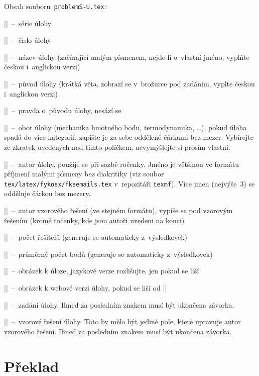 \documentclass[fykos]{fksbase}
\begin{document}
Obsah souboru~\texttt{problemS-U.tex}:
\begin{compactitem}
	\item \texinline|\probbatch|~--~série úlohy
	\item \texinline|\probno|~--~číslo úlohy
	\item \texinline|\probname|~--~název úlohy (začínající malým písmenem, nejde-li
		o~vlastní jméno, vyplňte českou i~anglickou verzi)
	\item \texinline|\proborigin|~--~původ úlohy (krátká věta, zobrazí se v~brožurce pod
		zadáním, vyplte českou i~anglickou verzi)
	\item \texinline|\proborigintruth|~--~pravda o~původu úlohy, nesází se
	\item \texinline|\probtopics|~--~obor úlohy (mechanika hmotného bodu, termodynamika, \dots),
	pokud úloha spadá do více kategorií, zapište je za sebe oddělené čárkami bez mezer.
	Vybírejte ze zkratek uvedených nad tímto políčkem, nevymýšlejte si prosím vlastní.
	\item \texinline|\probauthors|~--~autor úlohy, použije se při sazbě ročenky. Jméno
	je většinou ve formátu příjmení malými písmeny bez diakritiky (viz soubor
	\texttt{tex/latex/fykosx/fksemails.tex} v~repozitáři \texttt{texmf}). Více jmen
	(nejvýše~3) se odděluje čárkou bez mezery.
	\item \texinline|\probsolauthors|~--~autor vzorového řešení (ve stejném formátu),
		vypíše se pod vzorovým řešením (kromě ročenky, kde jsou autoři uvedeni na konci)
	\item \texinline|\probsolvers|~--~počet řešitelů (generuje se automaticky
		z~výsledkovek)
	\item \texinline|\probavg|~--~průměrný počet bodů (generuje se automaticky
		z~výsledkovek)
	\item \texinline|\probfig|~--~obrázek k úloze, jazykové verze rozlišujte,
	jen pokud se liší
	\item \texinline|\probwebfig|~--~obrázek k webové verzi úlohy, pokud se liší od
	\texinline|\probfig|
	\item \texinline|\probtask|~--~zadání úlohy. Ihned za posledním znakem musí
	být ukončena závorka.
	\item \texinline|\probsolution|~--~vzorové řešení úlohy. Toto by mělo být jediné
		pole, které upravuje autor vzorového řešení. Ihned za posledním znakem musí být
		ukončena závorka.
\end{compactitem}

\section{Překlad}
\end{document}
